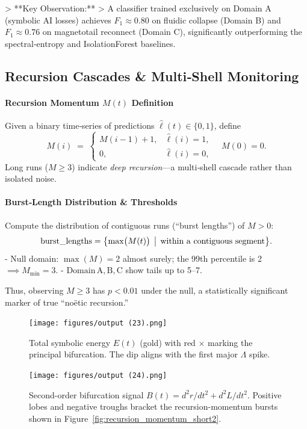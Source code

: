 \documentclass[11pt]{article}
\newcommand{\Leak}{\Lambda}
\begin{document}
> **Key Observation:**  
> A classifier trained exclusively on Domain A (symbolic AI losses) achieves \(F_{1} \approx 0.80\) on fluidic collapse (Domain B) and \(F_{1} \approx 0.76\) on magnetotail reconnect (Domain C), significantly outperforming the spectral‐entropy and IsolationForest baselines.

\subsection{Recursion Cascades \& Multi‐Shell Monitoring}
\paragraph{Recursion Momentum \(M(t)\) Definition}
Given a binary time‐series of predictions \(\hat{\ell}(t)\in\{0,1\}\), define
\[
  M(i) \;=\; 
  \begin{cases}
    M(i-1) + 1, & \hat{\ell}(i) = 1,\\
    0,          & \hat{\ell}(i) = 0,
  \end{cases}
  \quad M(0)=0.
\]
Long runs (\(M \ge 3\)) indicate \emph{deep recursion}—a multi‐shell cascade rather than isolated noise.

\paragraph{Burst‐Length Distribution \& Thresholds}
Compute the distribution of contiguous runs (“burst lengths”) of \(M > 0\):
\[
  \mathrm{burst\_lengths} = \bigl\{\max\bigl(M(t)\bigr)\,\bigm|\,\text{within a contiguous segment}\bigr\}.
\]
- \(\mathrm{Null}\) domain: \(\max(M) = 2\) almost surely; the 99th percentile is 2 \(\implies M_{\min} = 3\).  
- \(\mathrm{Domain\,A,B,C}\) show tails up to 5–7.

Thus, observing \(M \ge 3\) has \(p < 0.01\) under the null, a statistically significant marker of true “noëtic recursion.”

\begin{figure}[H]
  \centering
  \texttt{[image: figures/output (23).png]}
  \caption{Total symbolic energy \(E(t)\) (gold) with red \(\times\) marking the principal bifurcation. The dip aligns with the first major \(\Leak\) spike.}
  \label{fig:symbolic_energy_bifurcation}
\end{figure}

\begin{figure}[H]
  \centering
  \texttt{[image: figures/output (24).png]}
  \caption{Second-order bifurcation signal \(B(t)=d^2r/dt^2+d^2L/dt^2\). Positive lobes and negative troughs bracket the recursion-momentum bursts shown in Figure~\ref{fig:recursion_momentum_short2}.}
  \label{fig:second_order_bifurcation}
\end{figure}
\end{document}
